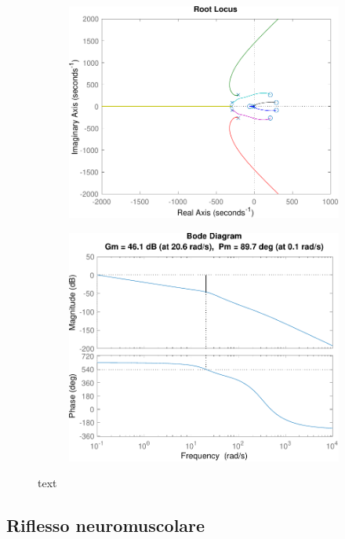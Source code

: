 \begin{figure}
	\begin{subfigure}{0.5\linewidth}
		\centering
		\includegraphics[width=0.9\linewidth]{../code/stretch/figs/rootlocus}
		\caption{}
	\end{subfigure}\hfill
	\begin{subfigure}{0.5\linewidth}
		\centering
		\includegraphics[width=0.9\linewidth]{../code/stretch/figs/margin}
		\caption{}
	\end{subfigure}\hfill
	\caption{text}
	\end{figure}

\subsection{Riflesso neuromuscolare}

